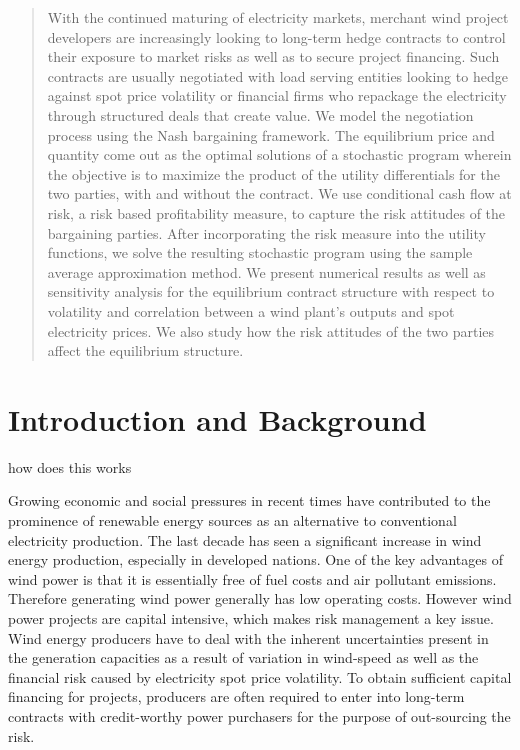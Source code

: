 \begin{abstract}
With the continued maturing of electricity markets, merchant wind project developers are increasingly looking to long-term hedge contracts to control their exposure to market risks as well as to secure project financing.  Such contracts are usually negotiated with load serving entities looking to hedge against spot price volatility or financial firms who repackage the electricity through structured deals that create value. We model the negotiation process using the Nash bargaining framework. The equilibrium price and quantity come out as the optimal solutions of a stochastic program wherein the objective is to maximize the product of the utility differentials for the two parties, with and without the contract. We use conditional cash flow at risk, a risk based profitability measure, to capture the risk attitudes of the bargaining parties. After incorporating the risk measure into the utility functions, we solve the resulting stochastic program using the sample average approximation method. We present numerical results as well as sensitivity analysis for the equilibrium contract structure with respect to volatility and correlation between a wind plant's outputs and spot electricity prices. We also study how the risk attitudes of the two parties affect the equilibrium structure.
\end{abstract}

\section{Introduction and Background}

how does this works 

\noindent Growing economic and social pressures in recent times have contributed to the prominence of renewable energy sources as an alternative to conventional electricity production. The last decade has seen a significant increase in wind energy production, especially in developed nations. One of the key advantages of wind power is that it is essentially free of fuel costs and air pollutant emissions. Therefore generating wind power generally has low operating costs. However wind power projects are capital intensive, which makes risk management a key issue. Wind energy producers have to deal with the inherent uncertainties present in the generation capacities as a result of variation in wind-speed as well as the financial risk caused by electricity spot price volatility. To obtain sufficient capital financing for projects, producers are often required to enter into long-term contracts with credit-worthy power purchasers for the purpose of out-sourcing the risk.\\

